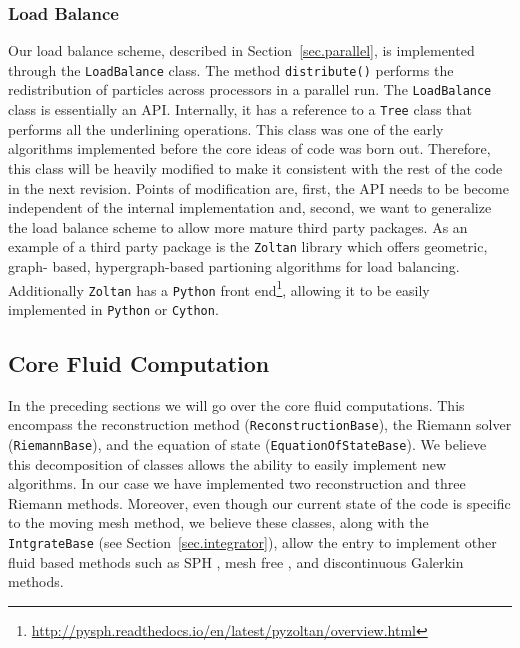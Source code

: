 \subsubsection{Load Balance}
Our load balance scheme, described in Section~\ref{sec.parallel}, is implemented through the 
\lstinline{LoadBalance} class. The method \lstinline{distribute()} performs the redistribution of particles 
across processors in a parallel run. The \lstinline{LoadBalance} class is essentially an API.
Internally, it has a reference to a \lstinline{Tree} class that performs all the underlining operations. This 
class was one of the early algorithms implemented before the core ideas of code was born out. Therefore, this 
class will be heavily modified to make it consistent with the rest of the code in the next revision.
Points of modification are, first, the API  needs to be become independent of the internal implementation and, 
second, we want to generalize the load balance scheme to allow more mature third party packages. As an example
of a third party package is the \texttt{Zoltan} library \citep{Devine2000} which offers geometric, graph-
based, hypergraph-based partioning algorithms for load balancing. Additionally \texttt{Zoltan} has a 
\texttt{Python} front end\footnote{\url{http://pysph.readthedocs.io/en/latest/pyzoltan/overview.html}},
allowing it to be easily implemented in \texttt{Python} or \texttt{Cython}.
 


\subsection{Core Fluid Computation}
In the preceding sections we will go over the core fluid computations. This encompass the
reconstruction method (\lstinline{ReconstructionBase}), the Riemann solver (\lstinline{RiemannBase}),
and the equation of state (\lstinline{EquationOfStateBase}).
We believe this decomposition of classes allows the ability to easily implement new algorithms. In
our case we have implemented two reconstruction and three Riemann methods. Moreover, even though our
current state of the code is specific to the moving mesh method, we believe these classes, along with the
\lstinline{IntgrateBase} (see Section~\ref{sec.integrator}), allow the entry to implement other fluid based 
methods such as SPH \citep{Gingold1977}, mesh free \citep{Hopkins2015}, and discontinuous 
Galerkin \citep{Mocz2014} methods.

